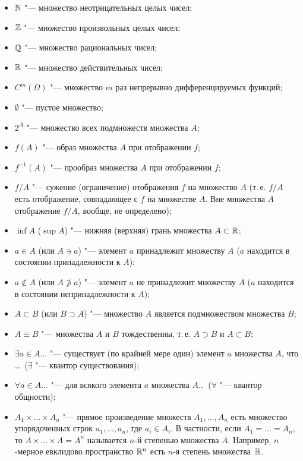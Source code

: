 \begin{itemize}[nosep,label={},leftmargin=1em]
\item $\mathbb N$ "--- множество неотрицательных целых чисел;
\item $\mathbb Z$ "--- множество произвольных целых чисел;
\item $\mathbb Q$ "--- множество рациональных чисел;
\item $\mathbb R$ "--- множество действительных чисел;
\item $C^m(\Omega)$ "--- множество $m$ раз непрерывно дифференцируемых функций;
\item $\emptyset$ "--- пустое множество;
\item $2^A$ "--- множество всех подмножеств множества $A$;
\item $f(A)$ "--- образ множества $A$ при отображении $f$;
\item $f^{-1}(A)$ "--- прообраз множества $A$ при отображении $f$;
\item $f/A$ "--- сужение (ограничение) отображения $f$ на множество $A$
  (т.\,е. $f/A$ есть отображение, совпадающее с $f$ на множестве $A$. Вне
  множества $A$ отображение $f/A$, вообще, не определено);
\item $\inf A$ ($\sup A$) "--- нижняя (верхняя) грань множества $A\subset\mathbb R$;
\item $a\in A$ (или $A\ni a$) "--- элемент $a$ принадлежит множеству $A$
  ($a$ находится в состоянии принадлежности к $A$);
\item $a\notin A$ (или $A\not\ni a$) "--- элемент $a$ не принадлежит
  множеству $A$ ($a$ находится в состоянии непринадлежности к $A$);
\item $A\subset B$ (или $B\supset A$) "--- множество $A$ является
  подмножеством множества $B$;
\item $A\equiv B$ "--- множества $A$ и $B$ тождественны, т.\,е.
  $A\supset B$ и $A\subset B$;
\item $\exists a\in A\dots$ "--- существует (по крайней мере один) элемент
  $a$ множества $A$, что \dots\ ($\exists$ "--- квантор существования);
%
\item $\forall a\in A\dots$ "--- для всякого элемента $a$ множества
  $A$\dots\ ($\forall$ "--- квантор общности);
\item $A_1\times\dots\times A_n$ "--- прямое произведение множеств
  $A_1,\dots,A_n$ есть множество упорядоченных строк $a_1,\dots,a_n$, где
  $a_i\in A_i$. В частности, если $A_1=\dots=A_n$, то
  $A\times\dots\times A=A^n$ называется $n$-й степенью множества $A$.
  Например, $n$-мерное евклидово пространство $\mathbb R^n$ есть $n$-я степень
  множества~$\mathbb R$.
\end{itemize}


